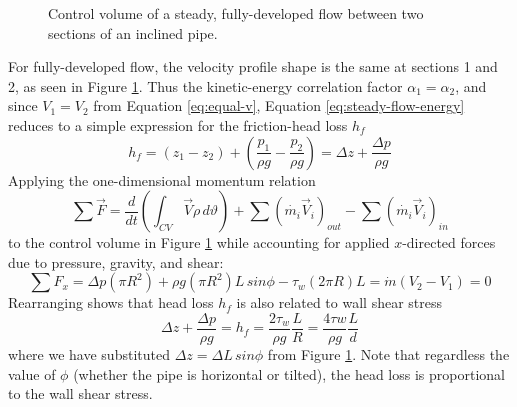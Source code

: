 \documentclass[9pt]{article} %
\numberwithin{equation}{section} %
\begin{document}
\begin{multicols}{2}
\begin{figure}[h]
\caption{Control volume of a steady, fully-developed flow between two sections of an inclined pipe.}
\label{fig:inclined-pipe}
\end{figure}
For fully-developed flow, the velocity profile shape is the same at sections 1 and 2, as seen in Figure \ref{fig:inclined-pipe}. Thus the kinetic-energy correlation factor $\alpha_{1} = \alpha_{2}$, and since $V_{1} = V_{2}$ from Equation \ref{eq:equal-v}, Equation \ref{eq:steady-flow-energy} reduces to a simple expression for the friction-head loss $h_{f}$ \cite{fluid-mechanics}
\begin{equation}
h_{f} = (z_{1} - z_{2}) + \left( \frac{p_{1}}{\rho g} - \frac{p_{2}}{\rho g} \right) = \Delta z + \frac{\Delta p}{\rho g}
\end{equation}
Applying the one-dimensional momentum relation
\begin{equation}
\sum \vec{F} = \frac{d}{dt} \left( \int_{CV} \vec{V} \rho\, d\vartheta \right) + \sum (\dot{m_{i}} \vec{V}_{i})_{out} - \sum (\dot{m_{i}} \vec{V}_{i})_{in}
\end{equation}
to the control volume in Figure \ref{fig:inclined-pipe} while accounting for applied $x$-directed forces due to pressure, gravity, and shear:
\begin{equation}
\sum F_{x} = \Delta p (\pi R^{2}) + \rho g (\pi R^{2}) L\, sin \phi - \tau_{w}(2 \pi R)L = \dot{m} (V_{2} - V_{1}) = 0
\end{equation}
Rearranging shows that head loss $h_{f}$ is also related to wall shear stress
\begin{equation} \label{eq:wall-shear-stress}
\Delta z + \frac{\Delta p}{\rho g} = h_{f} = \frac{2 \tau_{w}}{\rho g} \frac{L}{R} = \frac{4 \tau{w}}{\rho g} \frac{L}{d}
\end{equation}
where we have substituted $\Delta z = \Delta L\, sin \phi$ from Figure \ref{fig:inclined-pipe}. Note that regardless the value of $\phi$ (whether the pipe is horizontal or tilted), the head loss is proportional to the wall shear stress.


\end{multicols}
\end{document}
